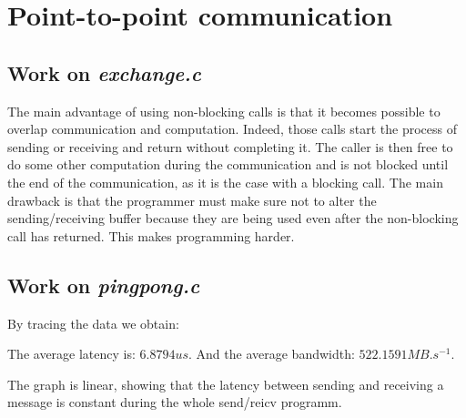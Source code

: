\chapter{Point-to-point communication}

\section{Work on \textit{exchange.c}}

The main advantage of using non-blocking calls is that it becomes possible to overlap communication and computation. Indeed, those calls start the process of sending or receiving and return without completing it. The caller is then free to do some other computation during the communication and is not blocked until the end of the communication, as it is the case with a blocking call. The main drawback is that the programmer must make sure not to alter the sending/receiving buffer because they are being used even after the non-blocking call has returned. This makes programming harder.

\section{Work on \textit{pingpong.c}}

By tracing the data we obtain:

  \begin{center}
  \end{center}

The average latency is: $6.8794us$. And the average bandwidth: $522.1591 MB.s^{-1}$.

The graph is linear, showing that the latency between sending and receiving a message is constant during the whole send/reicv programm.

